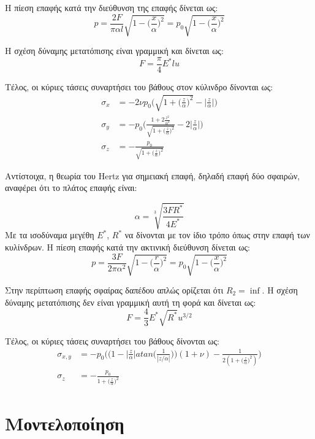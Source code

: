 \documentclass{article}
\begin{document}
Η πίεση επαφής κατά την διεύθυνση της επαφής δίνεται ως:
\begin{equation}
    p = \frac{2F}{\pi \alpha l} \sqrt{1 - \bigg(\frac{x}{\alpha}\bigg)^2} = p_0\sqrt{1 - \bigg(\frac{x}{\alpha}\bigg)^2}
\end{equation}


Η σχέση δύναμης μετατόπισης είναι γραμμική και δίνεται ως:
\begin{equation}
    F = \frac{\pi}{4}E^* l u
\end{equation}

Τέλος, οι κύριες τάσεις συναρτήσει του βάθους στον κύλινδρο δίνονται ως:
\begin{align}
    \sigma_x &= -2\nu p_0 \bigg(\sqrt{1 + \bigg(\frac{z}{\alpha}\bigg)^2} - \bigg|\frac{z}{\alpha}\bigg|\bigg)\\

    \sigma_y &= - p_0 \Bigg(\frac{1+2\frac{z^2}{\alpha^2}}{\sqrt{1 + \bigg(\frac{z}{\alpha}\bigg)^2}} - 2\bigg|\frac{z}{\alpha}\bigg|\Bigg)\\

    \sigma_z &= -\frac{p_0}{\sqrt{1 + \bigg(\frac{z}{\alpha}\bigg)^2}}
\end{align}



Αντίστοιχα, η θεωρία του Hertz για σημειακή επαφή, δηλαδή επαφή δύο σφαιρών,  αναφέρει ότι το πλάτος επαφής είναι:

\begin{equation}
    \alpha = \sqrt[3]{\frac{3 F R^*}{4 E^*}}
\end{equation}
Με τα ισοδύναμα μεγέθη $Ε^*$, $R^*$ να δίνονται με τον ίδιο τρόπο όπως στην επαφή των κυλίνδρων. Η πίεση επαφής κατά την ακτινική διεύθυνση δίνεται ως:
\begin{equation}
    p = \frac{3F}{2\pi \alpha^2} \sqrt{1 - \bigg(\frac{r}{\alpha}\bigg)^2} = p_0\sqrt{1 - \bigg(\frac{x}{\alpha}\bigg)^2}
\end{equation}

Στην περίπτωση επαφής σφαίρας δαπέδου απλώς ορίζεται ότι $R_2 = \inf$. Η σχέση δύναμης μετατόπισης δεν είναι γραμμική αυτή τη φορά και δίνεται ως:
\begin{equation}
    F = \frac{4}{3}E^* \sqrt{R^*} u^{3/2}
\end{equation}

Τέλος, οι κύριες τάσεις συναρτήσει του βάθους δίνονται ως:
\begin{align}
    \sigma_{x,y} &= - p_0 \bigg( \bigg(1-\bigg|\frac{z}{\alpha}\bigg| atan\bigg(\frac{1}{|z/\alpha|}\bigg)\bigg)(1+\nu)  - \frac{1}{2 (1 + \bigg(\frac{z}{\alpha}\bigg)^2)} \bigg)\\

    \sigma_z &= -\frac{p_0}{1 + \bigg(\frac{z}{\alpha}\bigg)^2}
\end{align}

\section{Μοντελοποίηση}
\end{document}
